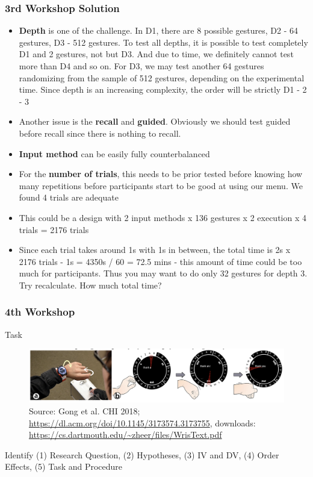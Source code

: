 \documentclass{beamer}
\begin{document}
\begin{frame}
	\frametitle{3rd Workshop Solution}
	\footnotesize
	\begin{itemize}
		\item \textbf{Depth} is one of the challenge.  In D1, there are 8 possible gestures, D2 - 64 gestures, D3 - 512 gestures.  To test all depths, it is possible to test completely D1 and 2 gestures, not but D3.  And due to time, we definitely cannot test more than D4 and so on.  For D3, we may test another 64 gestures randomizing from the sample of 512 gestures, depending on the experimental time.  Since depth is an increasing complexity, the order will be strictly D1 - 2 - 3
		\item Another issue is the \textbf{recall} and \textbf{guided}.  Obviously we should test guided before recall since there is nothing to recall.
		\item \textbf{Input method} can be easily fully counterbalanced
		\item For the \textbf{number of trials}, this needs to be prior tested before knowing how many repetitions before participants start to be good at using our menu.  We found 4 trials are adequate
		\item This could be a design with 2 input methods x 136 gestures x 2 execution x 4 trials = 2176 trials
		\item Since each trial takes around 1s with 1s in between, the total time is 2s x 2176 trials - 1s = 4350s / 60 = 72.5 mins - this amount of time could be too much for participants.  Thus you may want to do only 32 gestures for depth 3.  Try recalculate.  How much total time?
	\end{itemize}
\end{frame}

\begin{frame}
	\frametitle{4th Workshop}
	\footnotesize

	\begin{block}{Task}	
	\begin{figure}
		\includegraphics[width=0.6\linewidth]{wrist}
		\caption{Source: Gong et al. CHI 2018; \url{https://dl.acm.org/doi/10.1145/3173574.3173755}, downloads: \url{https://cs.dartmouth.edu/~zheer/files/WrisText.pdf}}
	\end{figure}
	
	Identify (1) Research Question, (2) Hypotheses, (3) IV and DV, (4) Order Effects, (5) Task and Procedure

	\end{block}
\end{frame}
\end{document}
